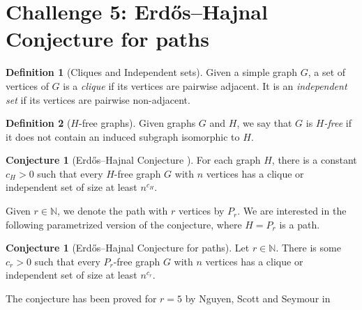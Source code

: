 \documentclass[12pt]{article}
\numberwithin{equation}{section}
\theoremstyle{definition}
\newtheorem{definition}{Definition}
\newtheorem{conjecture}[theorem]{Conjecture}
\begin{document}
\section*{Challenge 5: Erdős--Hajnal Conjecture for paths}


\begin{definition}[Cliques and Independent sets]
Given a simple graph $G$, a set of vertices of $G$ is a \textit{clique} if its vertices are pairwise adjacent. It is an \textit{independent set} if its vertices are pairwise non-adjacent. 
\end{definition}

\begin{definition}[$H$-free graphs]
Given graphs $G$ and $H$, we say that $G$ is \textit{$H$-free} if it does not contain an induced subgraph isomorphic to $H$. 
\end{definition}

\begin{conjecture}[Erdős–Hajnal Conjecture \mbox{\cite{erdos_hajnal}}]
For each graph $H$, there is a constant $c_H > 0$ such that every $H$-free graph $G$ with $n$ vertices has a clique or independent set of size at least $n^{c_H}$. 
\end{conjecture}

Given $r\in \mathbb{N}$, we denote the path with $r$ vertices by $P_r$.
We are interested in the following parametrized version of the conjecture, where $H=P_r$ is a path. 
\begin{conjecture}[Erdős–Hajnal Conjecture for paths]
Let $r\in \mathbb{N}$. There is some $c_r > 0$ such that every $P_r$-free graph $G$ with $n$ vertices has a clique or independent set of size at least $n^{c_r}$.
\end{conjecture}

The conjecture has been proved for $r=5$ by Nguyen, Scott and Seymour in \cite{nguyen2026induced}

\printbibliography
\end{document}
